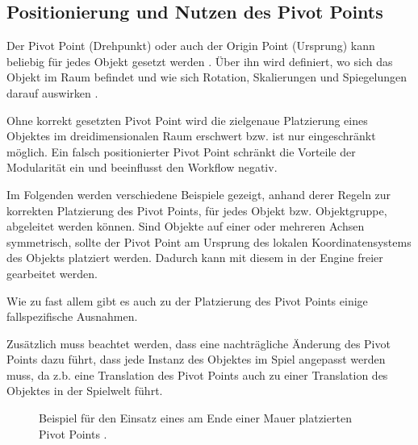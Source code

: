 \subsection{Positionierung und Nutzen des Pivot Points}
Der Pivot Point (Drehpunkt) oder auch der Origin Point (Ursprung) kann beliebig für jedes Objekt gesetzt werden \parencite[S.\,85]{blender}. Über ihn wird definiert, wo sich das Objekt im Raum befindet und wie sich Rotation, Skalierungen und Spiegelungen darauf auswirken \parencite[S.\,85 \& S.102]{blender}.
\par
Ohne korrekt gesetzten Pivot Point wird die zielgenaue Platzierung eines Objektes im dreidimensionalen Raum erschwert bzw. ist nur eingeschränkt möglich. Ein falsch positionierter Pivot Point schränkt die Vorteile der Modularität ein und beeinflusst den Workflow negativ. \parencite{Mader,ForHonor}
\par
Im Folgenden werden verschiedene Beispiele gezeigt, anhand derer Regeln zur korrekten Platzierung des Pivot Points, für jedes Objekt bzw. Objektgruppe, abgeleitet werden können. Sind Objekte auf einer oder mehreren Achsen symmetrisch, sollte der Pivot Point am Ursprung des lokalen Koordinatensystems des Objekts platziert werden. Dadurch kann mit diesem in der Engine freier gearbeitet werden. \parencite{Mader}
\par
Wie zu fast allem gibt es auch zu der Platzierung des Pivot Points einige fallspezifische Ausnahmen. 
\par
Zusätzlich muss beachtet werden, dass eine nachträgliche Änderung des Pivot Points dazu führt, dass jede Instanz des Objektes im Spiel angepasst werden muss, da z.b. eine Translation des Pivot Points auch zu einer Translation des Objektes in der Spielwelt führt. \parencite{Burgess}
\begin{figure}[!h]
\centering
  \caption{Beispiel für den Einsatz eines am Ende einer Mauer platzierten Pivot Points \parencite{unrealModular}.}
	\label{cornerPiece}
\end{figure}
